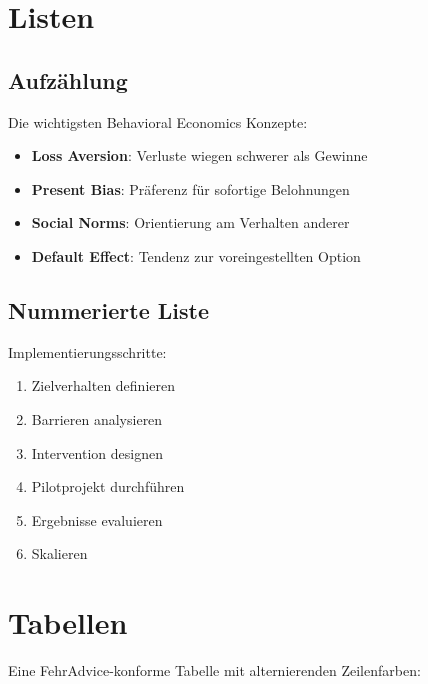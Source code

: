 \documentclass{fehradvice-report}
\begin{document}
\section{Listen}

\subsection{Aufzählung}

Die wichtigsten Behavioral Economics Konzepte:

\begin{itemize}
    \item \textbf{Loss Aversion}: Verluste wiegen schwerer als Gewinne
    \item \textbf{Present Bias}: Präferenz für sofortige Belohnungen
    \item \textbf{Social Norms}: Orientierung am Verhalten anderer
    \item \textbf{Default Effect}: Tendenz zur voreingestellten Option
\end{itemize}

\subsection{Nummerierte Liste}

Implementierungsschritte:

\begin{enumerate}
    \item Zielverhalten definieren
    \item Barrieren analysieren
    \item Intervention designen
    \item Pilotprojekt durchführen
    \item Ergebnisse evaluieren
    \item Skalieren
\end{enumerate}

\section{Tabellen}

Eine FehrAdvice-konforme Tabelle mit alternierenden Zeilenfarben:
\end{document}

